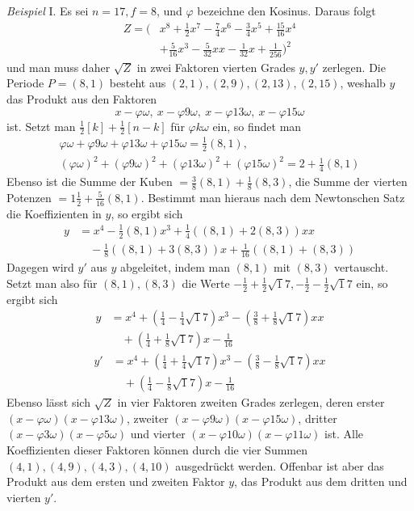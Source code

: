 \textit{Beispiel} I. Es sei \(n=17,\allowbreak f=8\), und \(\varphi\) bezeichne den Kosinus. Daraus folgt \[\begin{aligned}Z=\bigl(&x^8+\tfrac12x^7-\tfrac74x^6-\tfrac34x^5+\tfrac{15}{16}x^4\\&+\tfrac5{16}x^3-\tfrac5{32}xx-\tfrac1{32}x+\tfrac1{256}\bigr)^2\end{aligned}\] und man muss daher \(\surd Z\) in zwei Faktoren vierten Grades \(y,\allowbreak y'\) zerlegen. Die Periode \(P=(8,1)\) besteht aus \((2,1),\allowbreak (2,9),\allowbreak (2,13),\allowbreak (2,15)\), weshalb \(y\) das Produkt aus den Faktoren \[x-\varphi\omega,\ x-\varphi9\omega,\ x-\varphi13\omega,\ x-\varphi15\omega\] ist. Setzt man \(\tfrac12[k]+\tfrac12[n-k]\) für \(\varphi k\omega\) ein, so findet man \[\begin{gathered}\varphi\omega+\varphi9\omega+\varphi13\omega+\varphi15\omega=\tfrac12(8,1),\\(\varphi\omega)^2+(\varphi9\omega)^2+(\varphi13\omega)^2+(\varphi15\omega)^2=2+\tfrac14(8,1)\end{gathered}\] Ebenso ist die Summe der Kuben \(=\tfrac38(8,1)+\tfrac18(8,3)\), die Summe der vierten Potenzen \(=1\tfrac12+\tfrac5{16}(8,1)\). Bestimmt man hieraus nach dem Newtonschen Satz die Koeffizienten in \(y\), so ergibt sich \[\begin{aligned}y&=x^4-\tfrac12(8,1)x^3+\tfrac14((8,1)+2(8,3))xx\\&\quad-\tfrac18((8,1)+3(8,3))x+\tfrac1{16}((8,1)+(8,3))\end{aligned}\] Dagegen wird \(y'\) aus \(y\) abgeleitet, indem man \((8,1)\) mit \((8,3)\) vertauscht. Setzt man also für \((8,1),\allowbreak (8,3)\) die Werte \(-\tfrac12+\tfrac12\surd17,\allowbreak -\tfrac12-\tfrac12\surd17\) ein, so ergibt sich \[\begin{aligned}y&=x^4+(\tfrac14-\tfrac14\surd17)x^3-(\tfrac38+\tfrac18\surd17)xx\\&\quad+(\tfrac14+\tfrac18\surd17)x-\tfrac1{16}\end{aligned}\] \[\begin{aligned}y'&=x^4+(\tfrac14+\tfrac14\surd17)x^3-(\tfrac38-\tfrac18\surd17)xx\\&\quad+(\tfrac14-\tfrac18\surd17)x-\tfrac1{16}\end{aligned}\] Ebenso lässt sich \(\surd Z\) in vier Faktoren zweiten Grades zerlegen, deren erster \((x-\varphi\omega)(x-\varphi13\omega)\), zweiter \((x-\varphi9\omega)(x-\varphi15\omega)\), dritter \((x-\varphi3\omega)(x-\varphi5\omega)\) und vierter \((x-\varphi10\omega)(x-\varphi11\omega)\) ist. Alle Koeffizienten dieser Faktoren können durch die vier Summen \((4,1),\allowbreak (4,9),\allowbreak (4,3),\allowbreak (4,10)\) ausgedrückt werden. Offenbar ist aber das Produkt aus dem ersten und zweiten Faktor \(y\), das Produkt aus dem dritten und vierten \(y'\).


